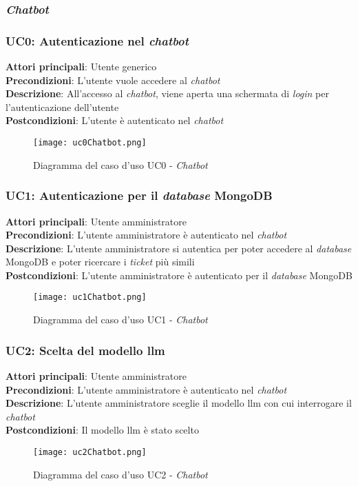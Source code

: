 \subsubsection{\textit{Chatbot}}

\subsubsection{UC0: Autenticazione nel \textit{chatbot}}
\textbf{Attori principali}: Utente generico \\
\textbf{Precondizioni}: L'utente vuole accedere al \textit{chatbot} \\
\textbf{Descrizione}: All'accesso al \textit{chatbot}, viene aperta una schermata di \textit{login} per l'autenticazione dell'utente \\
\textbf{Postcondizioni}: L'utente è autenticato nel \textit{chatbot} \\
\begin{figure}[H]
    \centering
    \texttt{[image: uc0Chatbot.png]}
    \caption{Diagramma del caso d'uso UC0 - \textit{Chatbot}}
    \label{fig:UC0Chatbot}
\end{figure}

\subsubsection{UC1: Autenticazione per il \textit{database} MongoDB}
\textbf{Attori principali}: Utente amministratore \\
\textbf{Precondizioni}: L'utente amministratore è autenticato nel \textit{chatbot} \\
\textbf{Descrizione}: L'utente amministratore si autentica per poter accedere al \textit{database} MongoDB e poter ricercare i \textit{ticket} più simili \\
\textbf{Postcondizioni}: L'utente amministratore è autenticato per il \textit{database} MongoDB \\
\begin{figure}[H]
    \centering
    \texttt{[image: uc1Chatbot.png]}
    \caption{Diagramma del caso d'uso UC1 - \textit{Chatbot}}
    \label{fig:UC1Chatbot}
\end{figure}


\subsubsection{UC2: Scelta del modello \gls{llm}}
\textbf{Attori principali}: Utente amministratore \\
\textbf{Precondizioni}: L'utente amministratore è autenticato nel \textit{chatbot} \\
\textbf{Descrizione}: L'utente amministratore sceglie il modello \gls{llm} con cui interrogare il \textit{chatbot} \\
\textbf{Postcondizioni}: Il modello \gls{llm} è stato scelto \\
\begin{figure}[H]
    \centering
    \texttt{[image: uc2Chatbot.png]}
    \caption{Diagramma del caso d'uso UC2 - \textit{Chatbot}}
    \label{fig:UC2Chatbot}
\end{figure}


